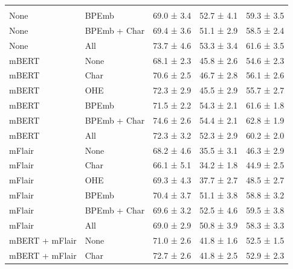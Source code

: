 \documentclass[12pt,a4paper,]{book}
\begin{document}
\begin{longtable}[t]{lllll}
\addlinespace[0.3em]
\multicolumn{5}{l}{\textbf{Multilingual embeddings}}\\
\hspace{1em}None & BPEmb & 69.0 ±  3.4 & 52.7 ±  4.1 & 59.3 ±  3.5\\
\hspace{1em}None & BPEmb + Char & 69.4 ±  3.6 & 51.1 ±  2.9 & 58.5 ±  2.4\\
\hspace{1em}None & All & 73.7 ±  4.6 & 53.3 ±  3.4 & 61.6 ±  3.5\\
\hspace{1em}mBERT & None & 68.1 ±  2.3 & 45.8 ±  2.6 & 54.6 ±  2.3\\
\hspace{1em}mBERT & Char & 70.6 ±  2.5 & 46.7 ±  2.8 & 56.1 ±  2.6\\
\hspace{1em}mBERT & OHE & 72.3 ±  2.9 & 45.5 ±  2.9 & 55.7 ±  2.7\\
\hspace{1em}mBERT & BPEmb & 71.5 ±  2.2 & 54.3 ±  2.1 & 61.6 ±  1.8\\
\hspace{1em}mBERT & BPEmb + Char & 74.6 ±  2.6 & 54.4 ±  2.1 & 62.8 ±  1.9\\
\hspace{1em}mBERT & All & 72.3 ±  3.2 & 52.3 ±  2.9 & 60.2 ±  2.0\\
\hspace{1em}mFlair & None & 68.2 ±  4.6 & 35.5 ±  3.1 & 46.3 ±  2.9\\
\hspace{1em}mFlair & Char & 66.1 ±  5.1 & 34.2 ±  1.8 & 44.9 ±  2.5\\
\hspace{1em}mFlair & OHE & 69.3 ±  4.3 & 37.7 ±  2.7 & 48.5 ±  2.7\\
\hspace{1em}mFlair & BPEmb & 70.4 ±  3.7 & 51.1 ±  3.8 & 58.8 ±  3.2\\
\hspace{1em}mFlair & BPEmb + Char & 69.6 ±  3.2 & 52.5 ±  4.6 & 59.5 ±  3.8\\
\hspace{1em}mFlair & All & 69.0 ±  2.9 & 50.8 ±  3.9 & 58.3 ±  3.3\\
\hspace{1em}mBERT + mFlair & None & 71.0 ±  2.6 & 41.8 ±  1.6 & 52.5 ±  1.5\\
\hspace{1em}mBERT + mFlair & Char & 72.7 ±  2.6 & 41.8 ±  2.5 & 52.9 ±  2.3\\

\end{longtable}
\end{document}
